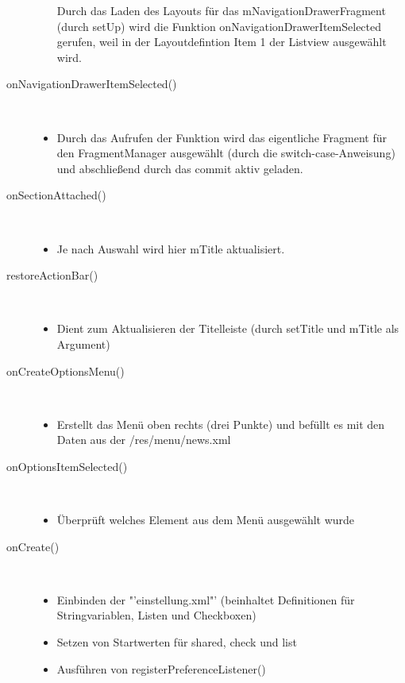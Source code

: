 \begin{description}
\begin{itemize}
Durch das Laden des Layouts für das mNavigationDrawerFragment (durch setUp) wird die Funktion onNavigationDrawerItemSelected gerufen, weil in der Layoutdefintion Item 1 der Listview ausgewählt wird.
\end{itemize}
 
\item[onNavigationDrawerItemSelected()]~\par
\begin{itemize}
\item Durch das Aufrufen der Funktion wird das eigentliche Fragment für den FragmentManager ausgewählt (durch die switch-case-Anweisung) und abschließend durch das commit aktiv geladen.
\end{itemize}

 
\item[onSectionAttached()]~\par
\begin{itemize}
\item Je nach Auswahl wird hier mTitle aktualisiert.
\end{itemize}

 
\item[restoreActionBar()]~\par
\begin{itemize}
\item Dient zum Aktualisieren der Titelleiste (durch setTitle und mTitle als Argument)
\end{itemize}

 
\item[onCreateOptionsMenu()]~\par
\begin{itemize}
\item Erstellt das Menü oben rechts (drei Punkte) und befüllt es mit den Daten aus der /res/menu/news.xml
\end{itemize}

 
\item[onOptionsItemSelected()]~\par
\begin{itemize}
\item Überprüft welches Element aus dem Menü ausgewählt wurde
\end{itemize}

\newpage

 
\item[onCreate()]~\par
\begin{itemize}
\item Einbinden der "'einstellung.xml"' (beinhaltet Definitionen für Stringvariablen, Listen und Checkboxen)
\item Setzen von Startwerten für shared, check und list
\item Ausführen von registerPreferenceListener()
\end{itemize}


\end{description}
